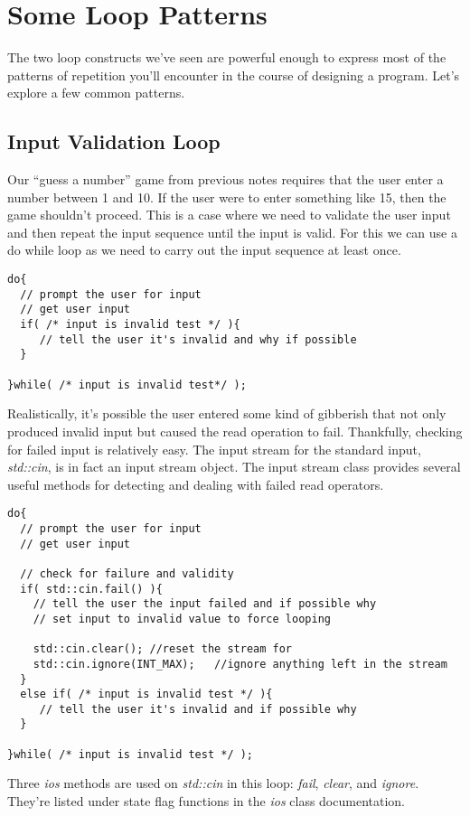 \documentclass[]{tufte-handout}
\begin{document}
\section{Some Loop Patterns}

The two loop constructs we've seen are powerful enough to express most of the patterns of repetition you'll encounter in the course of designing a program. Let's explore a few common patterns.

\subsection{Input Validation Loop}

Our ``guess a number'' game from previous notes requires that the user enter a number between 1 and 10.  If the user were to enter something like 15, then the game shouldn't proceed.  This is a case where we need to validate the user input and then repeat the input sequence until the input is valid.  For this we can use a do while loop as we need to carry out the input sequence at least once. 

\begin{verbatim}
do{
  // prompt the user for input
  // get user input
  if( /* input is invalid test */ ){
     // tell the user it's invalid and why if possible
  }
 
}while( /* input is invalid test*/ );
\end{verbatim} 

Realistically, it's possible the user entered some kind of gibberish that not only produced invalid input but caused the read operation to fail. Thankfully, checking for failed input is relatively easy.  The input stream for the standard input, \textit{std::cin}, is in fact an input stream object. The input stream class provides several useful  methods for detecting and dealing with failed read operators. 

\begin{verbatim}
do{
  // prompt the user for input
  // get user input

  // check for failure and validity
  if( std::cin.fail() ){
  	// tell the user the input failed and if possible why
  	// set input to invalid value to force looping
  	
	std::cin.clear(); //reset the stream for 
    std::cin.ignore(INT_MAX);	//ignore anything left in the stream 
  }
  else if( /* input is invalid test */ ){
     // tell the user it's invalid and if possible why
  }
 
}while( /* input is invalid test */ );
\end{verbatim} 
Three \textit{ios} methods are used on \textit{std::cin} in this loop: \textit{fail}, \textit{clear}, and \textit{ignore}.  They're listed under state flag functions in the \textit{ios} class documentation.
\end{document}
